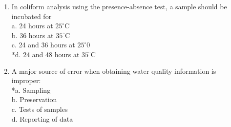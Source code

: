\begin{enumerate}[1.]
\item In coliform analysis using the presence-absence test, a sample should be incubated for\\
a. 24 hours at $25^{\circ} \mathrm{C}$\\
b. 36 hours at $35^{\circ} \mathrm{C}$\\
c. 24 and 36 hours at $25^{\circ} 0$\\
*d. 24 and 48 hours at $35^{\circ} \mathrm{C}$\\
\item A major source of error when obtaining water quality information is improper:\\
*a. Sampling\\
b. Preservation\\
c. Tests of samples\\
d. Reporting of data\\


\end{enumerate}
